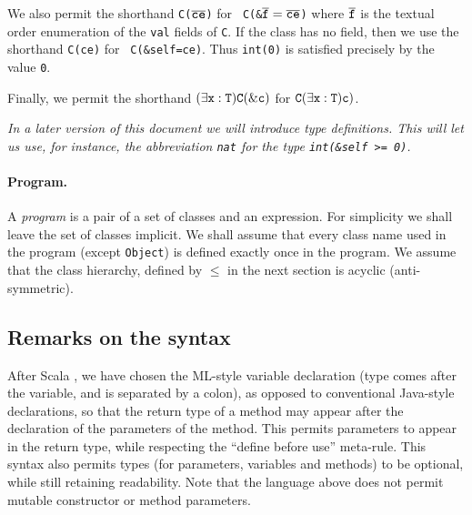 \documentclass{article}
\begin{document}
We also permit the shorthand {\tt C($\overline{\tt ce}$)} for {\tt
C(\&$\overline{\tt f}=\overline{\tt ce}$)} where $\tt \overline f$ is the textual
order enumeration of the {\tt val} fields of {\tt C}. If the class has
no field, then we use the shorthand {\tt C(ce)} for {\tt
C(\&self=ce)}. Thus {\tt int(0)} is satisfied precisely by the value
{\tt 0}.

Finally, we permit the shorthand $\tt (\exists x:T) C(\&c)$ for
$\tt C(\exists x:T)c)$.

{\em In a later version of this document we will introduce type definitions.
This will let us use, for instance, the abbreviation {\tt nat}
for the type {\tt int(\&self >= 0)}. 
}

\paragraph{Program.}
A {\em program} is a pair of a set of classes and an expression. For
simplicity we shall leave the set of classes implicit. We shall assume
that every class name used in the program (except {\tt Object}) is
defined exactly once in the program. We assume that the class
hierarchy, defined by $\leq$ in the next section is acyclic
(anti-symmetric).

\subsection{Remarks on the syntax}


After Scala \cite{scala}, we have chosen the ML-style variable
declaration (type comes after the variable, and is separated by a
colon), as opposed to conventional Java-style declarations, so that
the return type of a method may appear after the declaration of the
parameters of the method. This permits parameters to appear in the
return type, while respecting the ``define before use''
meta-rule. This syntax also permits types (for parameters, variables
and methods) to be optional, while still retaining readability.  Note
that the language above does not permit mutable constructor or method
parameters.
\end{document}
